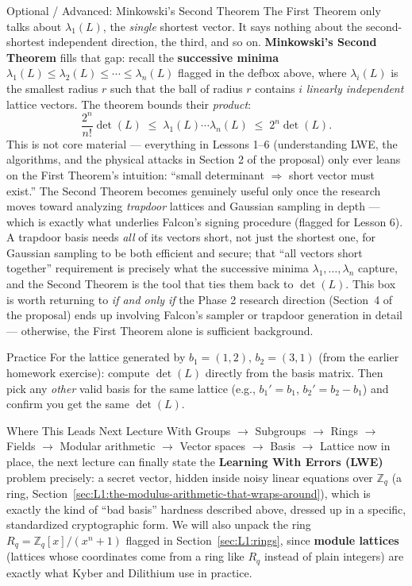 \begin{previewbox}{Optional / Advanced: Minkowski's Second Theorem}
The First Theorem only talks about $\lambda_1(L)$, the \emph{single} shortest vector. It says nothing about the second-shortest independent direction, the third, and so on. \textbf{Minkowski's Second Theorem} fills that gap: recall the \textbf{successive minima} $\lambda_1(L) \le \lambda_2(L) \le \cdots \le \lambda_n(L)$ flagged in the defbox above, where $\lambda_i(L)$ is the smallest radius $r$ such that the ball of radius $r$ contains $i$ \emph{linearly independent} lattice vectors. The theorem bounds their \emph{product}:
$$
\frac{2^n}{n!}\det(L) \;\le\; \lambda_1(L)\cdots\lambda_n(L) \;\le\; 2^n \det(L).
$$
This is not core material --- everything in Lessons 1--6 (understanding LWE, the algorithms, and the physical attacks in Section 2 of the proposal) only ever leans on the First Theorem's intuition: ``small determinant $\Rightarrow$ short vector must exist.'' The Second Theorem becomes genuinely useful only once the research moves toward analyzing \emph{trapdoor} lattices and Gaussian sampling in depth --- which is exactly what underlies Falcon's signing procedure (flagged for Lesson 6). A trapdoor basis needs \emph{all} of its vectors short, not just the shortest one, for Gaussian sampling to be both efficient and secure; that ``all vectors short together'' requirement is precisely what the successive minima $\lambda_1,\ldots,\lambda_n$ capture, and the Second Theorem is the tool that ties them back to $\det(L)$. This box is worth returning to \emph{if and only if} the Phase 2 research direction (Section~4 of the proposal) ends up involving Falcon's sampler or trapdoor generation in detail --- otherwise, the First Theorem alone is sufficient background.
\end{previewbox}

\begin{exercisebox}{Practice}
For the lattice generated by $b_1 = (1,2)$, $b_2 = (3,1)$ (from the earlier homework exercise): compute $\det(L)$ directly from the basis matrix. Then pick any \emph{other} valid basis for the same lattice (e.g., $b_1' = b_1$, $b_2' = b_2 - b_1$) and confirm you get the same $\det(L)$.
\end{exercisebox}

\begin{previewbox}{Where This Leads Next Lecture}
With Groups $\to$ Subgroups $\to$ Rings $\to$ Fields $\to$ Modular arithmetic $\to$ Vector spaces $\to$ Basis $\to$ Lattice now in place, the next lecture can finally state the \textbf{Learning With Errors (LWE)} problem precisely: a secret vector, hidden inside noisy linear equations over $\mathbb{Z}_q$ (a ring, Section~\ref{sec:L1:the-modulus-arithmetic-that-wraps-around}), which is exactly the kind of ``bad basis'' hardness described above, dressed up in a specific, standardized cryptographic form. We will also unpack the ring $R_q = \mathbb{Z}_q[x]/(x^n+1)$ flagged in Section~\ref{sec:L1:rings}, since \textbf{module lattices} (lattices whose coordinates come from a ring like $R_q$ instead of plain integers) are exactly what Kyber and Dilithium use in practice.
\end{previewbox}

